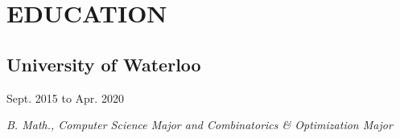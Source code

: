 \documentclass[11pt]{extarticle}
\begin{document}
\section*{EDUCATION}
\subsection*{University of Waterloo} \hfill Sept. 2015 to Apr. 2020

\textit{B. Math., Computer Science Major and Combinatorics \& Optimization Major}
\end{document}
